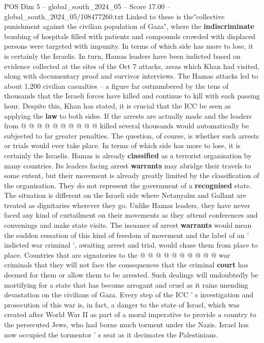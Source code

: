 \begin{textsample}{POS Dim 5 – global\_south\_2024\_05 – Score 17.00 – global\_south\_2024\_05/108477260.txt}
Linked to these is the"collective punishment against the civilian population of Gaza", where the \textbf{indiscriminate} bombing of hospitals filled with patients and compounds crowded with displaced persons were targeted with impunity.
In terms of which side has more to lose, it is certainly the Israelis.
In turn, Hamas leaders have been indicted based on evidence collected at the sites of the Oct 7 attacks, areas which Khan had visited, along with documentary proof and survivor interviews.
The Hamas attacks led to about 1,200 civilian casualties -- a figure far outnumbered by the tens of thousands that the Israeli forces have killed and continue to kill with each passing hour.
Despite this, Khan has stated, it is crucial that the ICC be seen as applying the \textbf{law} to both sides.
If the arrests are actually made and the leaders from @ @ @ @ @ @ @ @ @ @ killed several thousands would automatically be subjected to far greater penalties.
The question, of course, is whether such arrests or trials would ever take place.
In terms of which side has more to lose, it is certainly the Israelis.
Hamas is already \textbf{classified} as a terrorist organisation by many countries.
Its leaders facing arrest \textbf{warrants} may abridge their travels to some extent, but their movement is already greatly limited by the classification of the organisation.
They do not represent the government of a \textbf{recognised} state.
The situation is different on the Israeli side where Netanyahu and Gallant are treated as dignitaries wherever they go.
Unlike Hamas leaders, they have never faced any kind of curtailment on their movements as they attend conferences and convenings and make state visits.
The issuance of arrest \textbf{warrants} would mean the sudden cessation of this kind of freedom of movement and the label of an ' indicted war criminal ', awaiting arrest and trial, would chase them from place to place.
Countries that are signatories to the @ @ @ @ @ @ @ @ @ @ war criminals that they will not face the consequences that the criminal \textbf{court} has deemed for them or allow them to be arrested.
Such dealings will undoubtedly be mortifying for a state that has become arrogant and cruel as it rains unending devastation on the civilians of Gaza.
Every step of the ICC ' s investigation and prosecution of this war is, in fact, a danger to the state of Israel, which was created after World War II as part of a moral imperative to provide a country to the persecuted Jews, who had borne much torment under the Nazis.
Israel has now occupied the tormentor ' s seat as it decimates the Palestinians.

\end{textsample}
